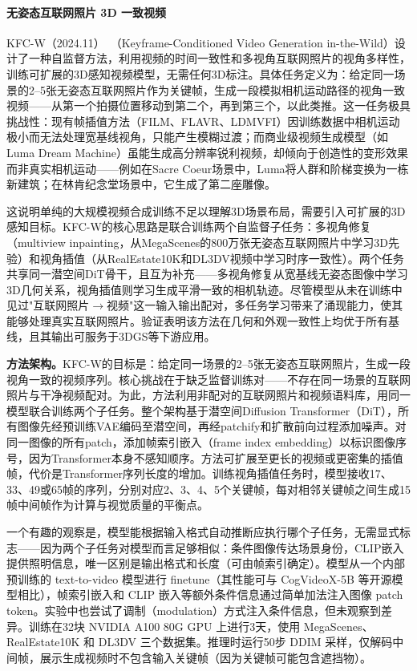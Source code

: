 \paragraph{无姿态互联网照片 3D 一致视频}

KFC-W（2024.11）~\cite{2411_13549}（Keyframe-Conditioned Video Generation in-the-Wild）设计了一种自监督方法，利用视频的时间一致性和多视角互联网照片的视角多样性，训练可扩展的3D感知视频模型，无需任何3D标注。具体任务定义为：给定同一场景的2--5张无姿态互联网照片作为关键帧，生成一段模拟相机运动路径的视角一致视频——从第一个拍摄位置移动到第二个，再到第三个，以此类推。这一任务极具挑战性：现有帧插值方法（FILM、FLAVR、LDMVFI）因训练数据中相机运动极小而无法处理宽基线视角，只能产生模糊过渡；而商业级视频生成模型（如Luma Dream Machine）虽能生成高分辨率锐利视频，却倾向于创造性的变形效果而非真实相机运动——例如在Sacre Coeur场景中，Luma将人群和阶梯变换为一栋新建筑；在林肯纪念堂场景中，它生成了第二座雕像。

这说明单纯的大规模视频合成训练不足以理解3D场景布局，需要引入可扩展的3D感知目标。KFC-W的核心思路是联合训练两个自监督子任务：多视角修复（multiview inpainting，从MegaScenes的800万张无姿态互联网照片中学习3D先验）和视角插值（从RealEstate10K和DL3DV视频中学习时序一致性）。两个任务共享同一潜空间DiT骨干，且互为补充——多视角修复从宽基线无姿态图像中学习3D几何关系，视角插值则学习生成平滑一致的相机轨迹。尽管模型从未在训练中见过"互联网照片$\to$视频"这一输入输出配对，多任务学习带来了涌现能力，使其能够处理真实互联网照片。验证表明该方法在几何和外观一致性上均优于所有基线，且其输出可服务于3DGS等下游应用。

\textbf{方法架构。}KFC-W的目标是：给定同一场景的2--5张无姿态互联网照片，生成一段视角一致的视频序列。核心挑战在于缺乏监督训练对——不存在同一场景的互联网照片与干净视频配对。为此，方法利用非配对的互联网照片和视频语料库，用同一模型联合训练两个子任务。整个架构基于潜空间Diffusion Transformer（DiT），所有图像先经预训练VAE编码至潜空间，再经patchify和扩散前向过程添加噪声。对同一图像的所有patch，添加帧索引嵌入（frame index embedding）以标识图像序号，因为Transformer本身不感知顺序。方法可扩展至更长的视频或更密集的插值帧，代价是Transformer序列长度的增加。训练视角插值任务时，模型接收17、33、49或65帧的序列，分别对应2、3、4、5个关键帧，每对相邻关键帧之间生成15帧中间帧作为计算与视觉质量的平衡点。

一个有趣的观察是，模型能根据输入格式自动推断应执行哪个子任务，无需显式标志——因为两个子任务对模型而言足够相似：条件图像传达场景身份，CLIP嵌入提供照明信息，唯一区别是输出格式和长度（可由帧索引确定）。模型从一个内部预训练的 text-to-video 模型进行 finetune（其性能可与 CogVideoX-5B 等开源模型相比），帧索引嵌入和 CLIP 嵌入等额外条件信息通过简单加法注入图像 patch token。实验中也尝试了调制（modulation）方式注入条件信息，但未观察到差异。训练在32块 NVIDIA A100 80G GPU 上进行3天，使用 MegaScenes、RealEstate10K 和 DL3DV 三个数据集。推理时运行50步 DDIM 采样，仅解码中间帧，展示生成视频时不包含输入关键帧（因为关键帧可能包含遮挡物）。

